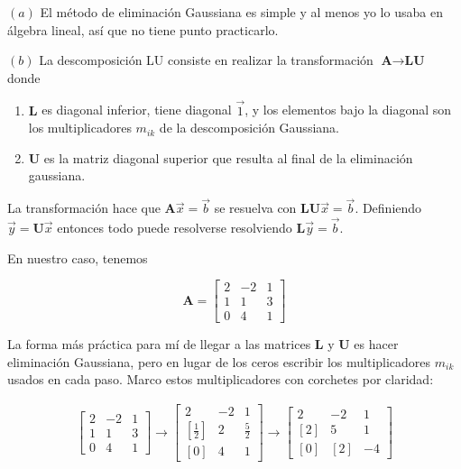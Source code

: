 \documentclass[12pt]{article}
\begin{document}
$(a)$ El método de eliminación Gaussiana es simple y al menos yo lo usaba en
álgebra lineal, así que no tiene punto practicarlo.

$(b)$ La descomposición LU consiste en realizar la transformación $\textbf{A}
\to \textbf{LU}$ donde 

\begin{enumerate}
    \item $\textbf{L}$ es diagonal inferior, tiene diagonal
$\overrightarrow{1}$, y los elementos bajo la diagonal son los multiplicadores 
$m_{ik}$ de la descomposición Gaussiana. 
\item $\textbf{U}$ es la matriz diagonal superior que resulta al final de la
    eliminación gaussiana.
\end{enumerate}

La transformación hace que $\textbf{A}\overrightarrow{x} = \overrightarrow{b}$
se resuelva con $\textbf{LU}\overrightarrow{x} = \overrightarrow{b}$. Definiendo 
$\overrightarrow{y} = \textbf{U}\overrightarrow{x}$ entonces todo puede
resolverse resolviendo $\textbf{L}\overrightarrow{y} = \overrightarrow{b}$. 

En nuestro caso, tenemos

\begin{equation*}
\textbf{A} = \begin{bmatrix} 2 & -2 & 1 \\ 1 & 1 & 3 \\ 0 & 4 & 1 \end{bmatrix}
\end{equation*}

La forma más práctica para mí de llegar a las matrices \textbf{L} y \textbf{U}
es hacer eliminación Gaussiana, pero en lugar de los ceros escribir los
multiplicadores $m_{ik}$ usados en cada paso. Marco estos multiplicadores con
corchetes por claridad:

\begin{align*}
\begin{bmatrix} 2 & -2 & 1 \\ 1 & 1 & 3 \\ 0 & 4 & 1 \end{bmatrix}
\to \begin{bmatrix} 
    2 & -2 & 1 \\ 
    [\frac{1}{2}] & 2 & \frac{5}{2} \\ 
    [0] & 4 & 1
\end{bmatrix} \to \begin{bmatrix} 
    2 & -2 & 1 \\ 
    [2] & 5 & 1 \\ 
    [0] & [2] & -4
\end{bmatrix} 
\end{align*}
\end{document}
